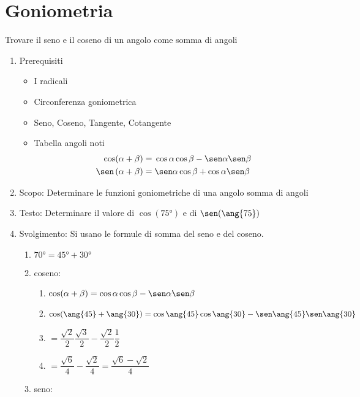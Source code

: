 \section{Goniometria}
\label{sec:EsempiGoniometria}
\begin{table}[H]
	\caption{Trovare il seno e il coseno di un angolo come somma di angoli}
	\label{tab:Trovaresenocosenonotatangenteangolo}
	\begin{enumerate}
		\item Prerequisiti 
		\begin{itemize}
			\item I radicali
			\item Circonferenza goniometrica
			\item Seno, Coseno, Tangente, Cotangente
			\item Tabella angoli noti
			\begin {align*}
			\cos(\alpha+\beta)=	{}&\cos\alpha\cos\beta-\sen\alpha\sen\beta \\ 
			\sen\left(\alpha+\beta\right)={}&\sen\alpha\cos\beta+\cos\alpha\sen\beta
		\end{align*}
	\end{itemize}
	\item Scopo: Determinare le funzioni goniometriche di una angolo somma di angoli
	\item Testo: Determinare il valore di $\cos(\ang{75})$ e di $\sen(\ang{75})$
	\item Svolgimento: Si usano le formule di somma  del seno e del coseno.
	\begin{enumerate}
		\item $\ang{70}=\ang{45}+\ang{30}$
		\item coseno:
		\begin{enumerate}
			\item $\cos(\alpha+\beta)=\cos\alpha\cos\beta-\sen\alpha\sen\beta$
			\item $\cos(\ang{45}+\ang{30})=\cos\ang{45}\cos\ang{30}-\sen\ang{45}\sen\ang{30}$
			\item $=\dfrac{\sqrt{2}}{2}\dfrac{\sqrt{3}}{2}-\dfrac{\sqrt{2}}{2}\dfrac{1}{2}$
			\item $=\dfrac{\sqrt{6}}{4}-\dfrac{\sqrt{2}}{4}=\dfrac{\sqrt{6}-\sqrt{2}}{4}$
		\end{enumerate}
		\item seno:

\end{enumerate}
\end{enumerate}
\end{table}
